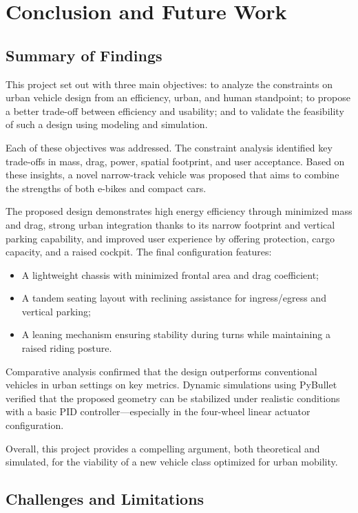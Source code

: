 \section{Conclusion and Future Work}

\subsection{Summary of Findings}

This project set out with three main objectives: to analyze the constraints on urban vehicle design from an efficiency, urban, and human standpoint; to propose a better trade-off between efficiency and usability; and to validate the feasibility of such a design using modeling and simulation.

Each of these objectives was addressed. The constraint analysis identified key trade-offs in mass, drag, power, spatial footprint, and user acceptance. Based on these insights, a novel narrow-track vehicle was proposed that aims to combine the strengths of both e-bikes and compact cars.

The proposed design demonstrates high energy efficiency through minimized mass and drag, strong urban integration thanks to its narrow footprint and vertical parking capability, and improved user experience by offering protection, cargo capacity, and a raised cockpit. The final configuration features:

\begin{itemize}
    \item A lightweight chassis with minimized frontal area and drag coefficient;
    \item A tandem seating layout with reclining assistance for ingress/egress and vertical parking;
    \item A leaning mechanism ensuring stability during turns while maintaining a raised riding posture.
\end{itemize}

Comparative analysis confirmed that the design outperforms conventional vehicles in urban settings on key metrics. Dynamic simulations using PyBullet verified that the proposed geometry can be stabilized under realistic conditions with a basic PID controller—especially in the four-wheel linear actuator configuration.

Overall, this project provides a compelling argument, both theoretical and simulated, for the viability of a new vehicle class optimized for urban mobility.

\subsection{Challenges and Limitations}

